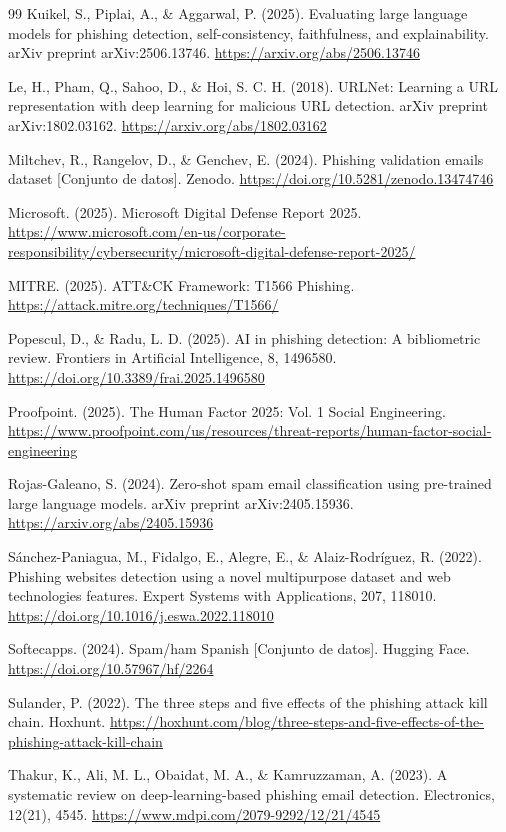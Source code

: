 \documentclass[11pt,a4paper,oneside]{report}
\begin{document}
\begin{thebibliography}{99}
 Kuikel, S., Piplai, A., \& Aggarwal, P. (2025). Evaluating large language models for phishing detection, self-consistency, faithfulness, and explainability. arXiv preprint arXiv:2506.13746. \url{https://arxiv.org/abs/2506.13746}

 Le, H., Pham, Q., Sahoo, D., \& Hoi, S. C. H. (2018). URLNet: Learning a URL representation with deep learning for malicious URL detection. arXiv preprint arXiv:1802.03162. \url{https://arxiv.org/abs/1802.03162}

 Miltchev, R., Rangelov, D., \& Genchev, E. (2024). Phishing validation emails dataset [Conjunto de datos]. Zenodo. \url{https://doi.org/10.5281/zenodo.13474746}

 Microsoft. (2025). Microsoft Digital Defense Report 2025. \url{https://www.microsoft.com/en-us/corporate-responsibility/cybersecurity/microsoft-digital-defense-report-2025/}

 MITRE. (2025). ATT\&CK Framework: T1566 Phishing. \url{https://attack.mitre.org/techniques/T1566/}

 Popescul, D., \& Radu, L. D. (2025). AI in phishing detection: A bibliometric review. Frontiers in Artificial Intelligence, 8, 1496580. \url{https://doi.org/10.3389/frai.2025.1496580}

 Proofpoint. (2025). The Human Factor 2025: Vol. 1 Social Engineering. \url{https://www.proofpoint.com/us/resources/threat-reports/human-factor-social-engineering}

 Rojas-Galeano, S. (2024). Zero-shot spam email classification using pre-trained large language models. arXiv preprint arXiv:2405.15936. \url{https://arxiv.org/abs/2405.15936}

 Sánchez-Paniagua, M., Fidalgo, E., Alegre, E., \& Alaiz-Rodríguez, R. (2022). Phishing websites detection using a novel multipurpose dataset and web technologies features. Expert Systems with Applications, 207, 118010. \url{https://doi.org/10.1016/j.eswa.2022.118010}

 Softecapps. (2024). Spam/ham Spanish [Conjunto de datos]. Hugging Face. \url{https://doi.org/10.57967/hf/2264}

 Sulander, P. (2022). The three steps and five effects of the phishing attack kill chain. Hoxhunt. \url{https://hoxhunt.com/blog/three-steps-and-five-effects-of-the-phishing-attack-kill-chain}

 Thakur, K., Ali, M. L., Obaidat, M. A., \& Kamruzzaman, A. (2023). A systematic review on deep-learning-based phishing email detection. Electronics, 12(21), 4545. \url{https://www.mdpi.com/2079-9292/12/21/4545}


\end{thebibliography}
\end{document}
